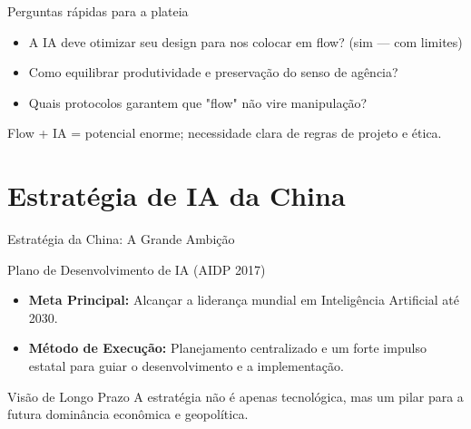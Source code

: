 \documentclass[aspectratio=169,12pt]{beamer}
\begin{document}
\begin{frame}{Perguntas rápidas para a plateia}
  \begin{itemize}
    \item A IA deve otimizar seu design para nos colocar em flow? (sim — com limites)
    \item Como equilibrar produtividade e preservação do senso de agência?
    \item Quais protocolos garantem que "flow" não vire manipulação?
  \end{itemize}
  Flow + IA = potencial enorme; necessidade clara de regras de projeto e ética. 
\end{frame}

\section{Estratégia de IA da China}


\begin{frame}{Estratégia da China: A Grande Ambição}
    \begin{block}{Plano de Desenvolvimento de IA (AIDP 2017)}
        \begin{itemize}
            \item \textbf{Meta Principal:} Alcançar a liderança mundial em Inteligência Artificial até 2030.
            \item \textbf{Método de Execução:} Planejamento centralizado e um forte impulso estatal para guiar o desenvolvimento e a implementação.
        \end{itemize}
    \end{block}
    
    \begin{alertblock}{Visão de Longo Prazo}
        A estratégia não é apenas tecnológica, mas um pilar para a futura dominância econômica e geopolítica.
    \end{alertblock}
\end{frame}
\end{document}
